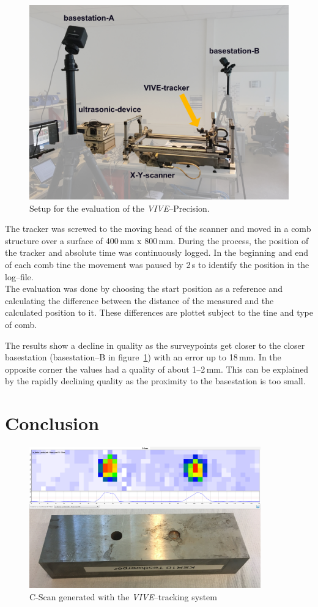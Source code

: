 \documentclass{VRARWorkshop}
\begin{document}
\begin{figure}[h!]
    \begin{center}
        \includegraphics[width=120mm]{images/PrecisionMeasurement}
        \caption{\label{fig:precisionMeasurementSetup} Setup for the evaluation of the \textit{VIVE}--Precision.}
    \end{center}
\end{figure}

The tracker was screwed to the moving head of the scanner and moved in a comb structure over a surface of 400\,mm x 800\,mm.
During the process, the position of the tracker and absolute time was continuously logged.
In the beginning and end of each comb tine the movement was paused by 2\,s to identify the position in the log--file.\\

The evaluation was done by choosing the start position as a reference and calculating the difference between the distance of the measured and the calculated position to it.
These differences are plottet subject to the tine and type of comb.

The results show a decline in quality as the surveypoints get closer to the closer basestation (basestation--B in figure~\ref{fig:precisionMeasurementSetup}) with an error up to 18\,mm.
In the opposite corner the values had a quality of about 1--2\,mm.
This can be explained by the rapidly declining quality as the proximity to the basestation is too small.

\section{Conclusion}

\begin{figure}[h!]
    \begin{center}
        \includegraphics[width=100mm]{images/CScanARUS}
        \caption{\label{fig:resultCScan} C-Scan generated with the \textit{VIVE}--tracking system}
    \end{center}
\end{figure}

\VRARsetbibstyle

\end{document}
